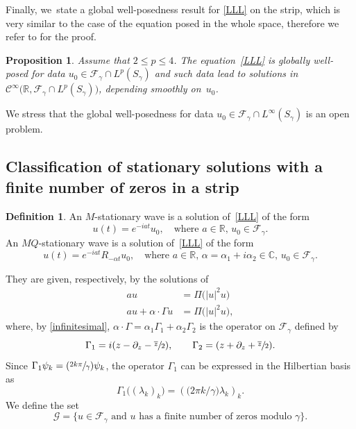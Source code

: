 \documentclass[10pt]{amsart}
\newcommand{\Psfrac}[2]{(\sfrac{#1}{#2})}
\newtheorem{prop}[theorem]{Proposition}
\theoremstyle{definition}
\newtheorem{df}[theorem]{Definition}
\let\ov\overline
\newcommand\C{\mathbb C}
\newcommand\R{\mathbb R}
\let\Subsection\subsection\let\Subsubsection\subsubsection
\begin{document}
Finally, we~state a global well-posedness result for \eqref{LLL} on the strip, which is very similar to the case of the equation posed in the whole space, therefore we refer to \cite[Prop.\,3.7]{GGT} for the proof.
\begin{prop}
Assume that $2\leq p\leq 4$. The equation~\eqref{LLL} is globally well-posed for data $u_0 \in \mathcal{F}_{\gamma} \cap L^p(S_{\gamma})$ and such data lead to solutions in $\mathcal{C}^\infty \bigl(\R, \mathcal{F}_{\gamma} \cap L^p(S_{\gamma}) \bigr)$, depending smoothly on~$u_0$.
\end{prop}

We stress that the global well-posedness for data $u_0 \in \mathcal{F}_{\gamma} \cap L^{\infty}(S_{\gamma}) $ is an open problem.

\Subsection{Classification of stationary solutions with a finite number of zeros in a strip}

\begin{df}
An $M$-stationary wave is a solution of~\eqref{LLL} of the form
\[
u(t) = e^{-i a t} u_0, \quad \text{where $a \in \mathbb{R}$, $u_0 \in \mathcal{F}_{\gamma}$}.
\]
An $MQ$-stationary wave is a solution of~\eqref{LLL} of the form
\[
u(t) = e^{-i a t} R_{-\alpha t}u_0, \quad \text{where $a \in \mathbb{R}$, $\alpha=\alpha_1+i\alpha_2 \in \mathbb{\C}$, $u_0 \in \mathcal{F}_{\gamma}$}.
\]
\end{df}

They are given, respectively, by the solutions of
\begin{align}
\label{M} \tag{$M$}
a u &= \Pi \bigl(|u|^2 u\bigr)
\\
\label{MQ} \tag{$MQ$}
a u + \alpha \cdot \Gamma u &= \Pi \bigl(|u|^2 u\bigr),
\end{align}
where, by \eqref{infinitesimal}, $\alpha \cdot \Gamma =\alpha_1 \Gamma_1+\alpha_2 \Gamma_2 $ is the operator on $\mathcal{F}_\gamma$ defined by
\begin{equation*}
\Gamma_1=i(z -\partial_z-\sfrac{\ov z}2), \qquad \Gamma_2=(z +\partial_z+\sfrac{\ov z}2).
\end{equation*}
Since $\Gamma_1 \psi_k = \Psfrac{2 k \pi}\gamma \psi_k$, the operator $\Gamma_1$ can be expressed in the Hilbertian basis as
\[
\Gamma_1 \bigl((\lambda_k)_k\bigr) = \left(\bigl({2\pi k}/{\gamma} \bigr) \lambda_k\right)_k.
\]
We define the set
\begin{equation*}
\mathcal{G}=\bigl\{u\in \mathcal{F}_\gamma \text{ and } u \text{ has a finite number of zeros modulo $\gamma$} \bigr\}.
\end{equation*}
\end{document}
